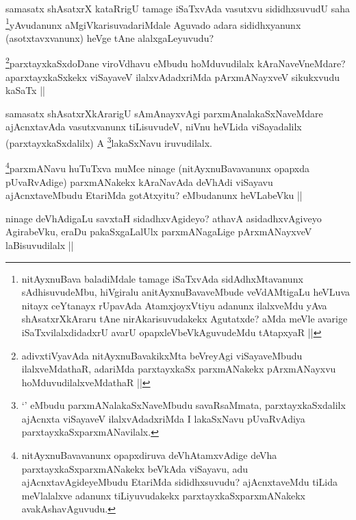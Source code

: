 \begin{artha}
samasatx shAsatxrX kataRrigU tamage iSaTxvAda vasutxvu sididhxsuvudU saha \footnote{nitAyxnuBava baladiMdale tamage iSaTxvAda sidAdhxMtavanunx sAdhisuvudeMbu, hiVgiralu anitAyxnuBavaveMbude veVdAMtigaLu heVLuva nitayx ceYtanayx rUpavAda AtamxjoyxVtiyu adanunx ilalxveMdu yAva shAsatxrXkAraru tAne nirAkarisuvudakekx Agutatxde? aMda meVle avarige iSaTxvilalxdidadxrU avarU opapxleVbeVkAguvudeMdu tAtapxyaR ||}yAvudanunx aMgiVkarisuvadariMdale Aguvado adara sididhxyanunx (asotxtavxvanunx) heVge tAne alalxgaLeyuvudu?
\end{artha}

\begin{artha}
\footnote{adivxtiVyavAda nitAyxnuBavakikxMta beVreyAgi viSayaveMbudu ilalxveMdathaR, adariMda parxtayxkaSx parxmANakekx pArxmANayxvu hoMduvudilalxveMdathaR ||}parxtayxkaSxdoDane viroVdhavu eMbudu hoMduvudilalx kAraNaveVneMdare? aparxtayxkaSxkekx viSayaveV ilalxvAdadxriMda pArxmANayxveV sikukxvudu kaSaTx ||
\end{artha}

\begin{artha}
samasatx shAsatxrXkArarigU sAmAnayxvAgi parxmAnalakaSxNaveMdare ajAcnxtavAda vasutxvanunx tiLisuvudeV, niVnu heVLida viSayadalilx (parxtayxkaSxdalilx) A \footnote{`\stext' eMbudu parxmANalakaSxNaveMbudu savaRsaMmata, parxtayxkaSxdalilx ajAcnxta viSayaveV ilalxvAdadxriMda I lakaSxNavu pUvaRvAdiya parxtayxkaSxparxmANavilalx.}lakaSxNavu iruvudilalx.
\end{artha}

\begin{artha}
\footnote[3]{nitAyxnuBavavanunx opapxdiruva deVhAtamxvAdige deVha parxtayxkaSxparxmANakekx beVkAda viSayavu, adu ajAcnxtavAgideyeMbudu EtariMda sididhxsuvudu? ajAcnxtaveMdu tiLida meVlalalxve adanunx tiLiyuvudakekx parxtayxkaSxparxmANakekx avakAshavAguvudu.}parxmANavu huTuTxva muMce ninage (nitAyxnuBavavanunx opapxda pUvaRvAdige) parxmANakekx kAraNavAda deVhAdi viSayavu ajAcnxtaveMbudu EtariMda gotAtxyitu? eMbudanunx heVLabeVku ||
\end{artha}

\begin{artha}
ninage deVhAdigaLu savxtaH sidadhxvAgideyo? athavA asidadhxvAgiveyo AgirabeVku, eraDu pakaSxgaLalUlx parxmANagaLige pArxmANayxveV laBisuvudilalx ||
\end{artha}

